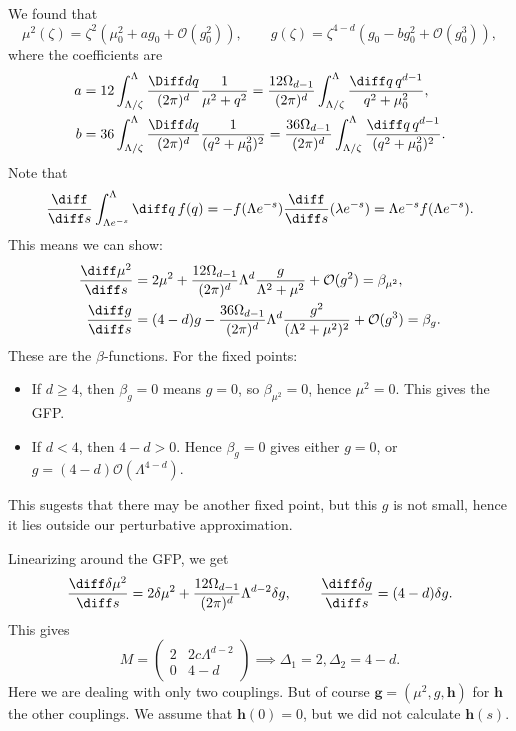 \documentclass[12pt]{article}
\begin{document}
We found that
\[
\mu^2(\zeta) = \zeta^2 (\mu_0^2 + a g_0 + \mathcal{O}(g_0^2)), \qquad g(\zeta) = \zeta^{4 - d}(g_0- b g_0^2 + \mathcal{O}(g_0^3)),
\]
where the coefficients are
\begin{align*}
	a &= 12 \int_{\Lambda/\zeta}^\Lambda \frac{\Diff d q}{(2 \pi)^d} \frac{1}{\mu^2 + q^2} = \frac{12 \Omega_{d-1}}{(2 \pi)^d} \int_{\Lambda / \zeta}^{\Lambda} \frac{\diff q \, q^{d-1}}{q^2 + \mu_0^2}, \\
	b &= 36 \int_{\Lambda/\zeta}^{\Lambda} \frac{\Diff d q}{(2 \pi)^{d}} \frac{1}{(q^2 + \mu_0^2)^2} = \frac{36 \Omega_{d-1}}{(2 \pi)^{d}} \int_{\Lambda/\zeta}^{\Lambda} \frac{\diff q \, q^{d-1}}{(q^2 + \mu_0^2)^2}.
\end{align*}
Note that
\[
\frac{\diff}{\diff s}\int_{\Lambda e^{-s}}^{\Lambda} \diff q \, f(q) = - f(\Lambda e^{-s}) \frac{\diff}{\diff s} (\lambda e^{-s}) = \Lambda e^{-s} f(\Lambda e^{-s}).
\]
This means we can show:
\begin{align*}
	\frac{\diff \mu^2}{\diff s} &= 2 \mu^2 + \frac{12 \Omega_{d-1}}{(2 \pi)^{d}} \Lambda^{d} \frac{g}{\Lambda^2 + \mu^2} + \mathcal{O}(g^2) = \beta_{\mu^2},\\
	\frac{\diff g}{\diff s} &= (4 - d) g - \frac{36 \Omega_{d-1}}{(2 \pi)^d} \Lambda^{d} \frac{g^2}{(\Lambda^2 + \mu^2)^2} + \mathcal{O}(g^3) = \beta_{g}.
\end{align*}
These are the $\beta$-functions. For the fixed points:
\begin{itemize}
	\item If $d \geq 4$, then $\beta_g = 0$ means $g = 0$, so $\beta_{\mu^2} = 0$, hence $\mu^2 = 0$. This gives the GFP.
	\item If $d < 4$, then $4 - d > 0$. Hence $\beta_g = 0$ gives either $g = 0$, or $g = (4 - d) \mathcal{O}(\Lambda^{4-d})$.
\end{itemize}
This sugests that there may be another fixed point, but this $g$ is not small, hence it lies outside our perturbative approximation.

Linearizing around the GFP, we get
\[
\frac{\diff \delta \mu^2}{\diff s} = 2 \delta \mu^2 + \frac{12 \Omega_{d-1}}{(2 \pi)^d} \Lambda^{d-2} \delta g, \qquad \frac{\diff \delta g}{\diff s} = (4 - d) \delta g.
\]
This gives
\[
M =
\begin{pmatrix}
	2 & 2c \Lambda^{d-2} \\ 0 & 4 - d \end{pmatrix}
\implies \Delta_1 = 2, \Delta_2 = 4 - d.
\]
Here we are dealing with only two couplings. But of course $\mathbf{g} = (\mu^2, g, \mathbf{h})$ for $\mathbf{h}$ the other couplings. We assume that $\mathbf{h}(0)= 0$, but we did not calculate $\mathbf{h}(s)$.
\end{document}
